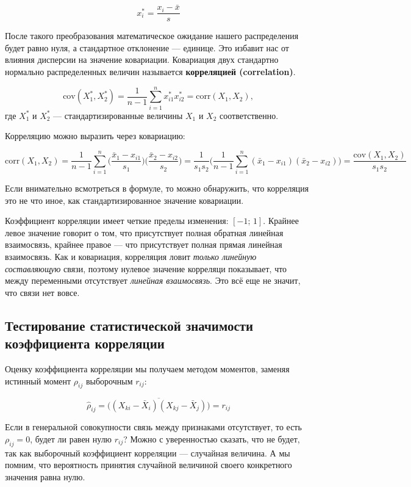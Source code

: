 \documentclass[
  letterpaper,
]{scrbook}
\theoremstyle{definition}
\theoremstyle{remark}
\begin{document}
\[
x_i^* = \frac{x_i - \bar x}{s}
\]

После такого преобразования математическое ожидание нашего распределения
будет равно нуля, а стандартное отклонение --- единице. Это избавит нас
от влияния дисперсии на значение ковариации. Ковариация двух стандартно
нормально распределенных величин называется \textbf{корреляцией
(correlation)}.

\[
\mathrm{cov}(X_1^*, X_2^*) = \frac{1}{n-1} \sum_{i=1}^n x_{i1}^* x_{i2}^* = \mathrm{corr}(X_1, X_2),
\] где \(X_1^*\) и \(X_2^*\) --- стандартизированные величины \(X_1\) и
\(X_2\) соответственно.

Корреляцию можно выразить через ковариацию:

\[
\mathrm{corr}(X_1, X_2) = \frac{1}{n-1} \sum_{i=1}^n \Big( \frac{\bar x_1 - x_{i1}}{s_1} \Big) \Big( \frac{\bar x_2 - x_{i2}}{s_2} \Big) = 
\frac{1}{s_1 s_2} \Big( \frac{1}{n-1} \sum_{i=1}^n (\bar x_1 - x_{i1})(\bar x_2 - x_{i2}) \Big) = \frac{\mathrm{cov}(X_1, X_2)}{s_1 s_2}
\]

Если внимательно всмотреться в формуле, то можно обнаружить, что
корреляция это не что иное, как стандартизированное значение ковариации.

Коэффициент корреляции имеет четкие пределы изменения: \([-1; \,1]\).
Крайнее левое значение говорит о том, что присутствует полная обратная
линейная взаимосвязь, крайнее правое --- что присутствует полная прямая
линейная взаимосвязь. Как и ковариация, корреляция ловит \emph{только
линейную составляющую} связи, поэтому нулевое значение корреляци
показывает, что между переменными отсутствует \emph{линейная
взаимосвязь}. Это всё еще не значит, что связи нет вовсе.

\subsection{Тестирование статистической значимости коэффициента
корреляции}\label{andan-corr-test}

Оценку коэффициента корреляции мы получаем методом моментов, заменяя
истинный момент \(\rho_{ij}\) выборочным \(r_{ij}\):

\[
\hat \rho_{ij} = \overline{\big( (X_{ki} - \bar X_i) (X_{kj} - \bar X_j) \big)} = r_{ij}
\]

Если в генеральной совокупности связь между признаками отсутствует, то
есть \(\rho_{ij} = 0\), будет ли равен нулю \(r_{ij}\)? Можно с
уверенностью сказать, что не будет, так как выборочный коэффициент
корреляции --- случайная величина. А мы помним, что вероятность принятия
случайной величиной своего конкретного значения равна нулю.
\end{document}
